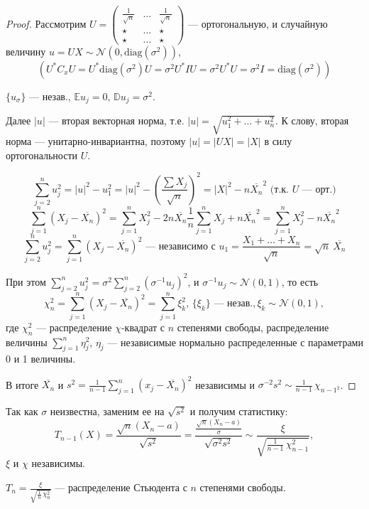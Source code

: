 \begin{enumerate}
\begin{proof}
		Рассмотрим $U = \left(\begin{matrix} \frac1{\sqrt{n}} & \dots & \frac1{\sqrt{n}} \\[-0 pt] \star & \dots & \star \\[-0 pt] \star & \dots & \star \end{matrix}\right)$ --- ортогональную, и случайную величину $u = UX \sim \mathcal{N}(0, \text{diag}(\sigma^2))$, 
		\[ \left( U^{*} C_x U = U^{*}\text{diag}(\sigma^2)U = \sigma^2 U^{*} I U = \sigma^2 U^{*} U = \sigma^2 I = \text{diag}(\sigma^2) \right) \]
		
		$\{ u_{\sigma} \}$ --- незав., $\mathbb{E} u_j = 0, \, \mathbb{D} u_j = \sigma^2$.
		
		Далее $|u|$ --- вторая векторная норма, т.е. $|u| = \sqrt{u_1^2 + \ldots + u_n^2}$. К слову, вторая норма --- унитарно-инвариантна, поэтому $|u| = |UX| = |X|$ в силу ортогональности $U$.
		
		\[ \sum_{j=2}^n u_j^2 = |u|^2 - u_1^2 = |u|^2 - \left( \frac{\sum X_j}{\sqrt{n}} \right)^2 = |X|^2 - n\overline{X_n}^2 \text{ (т.к. $U$ --- орт.)} \]
		\[ \sum_{j=1}^n (X_j - \overline{X_n})^2 = \sum_{j=1}^n X_j^2 - 2n \overline{X_n} \frac{1}{n} \sum_{j=1}^n X_j + n\overline{X_n}^2 = \sum_{j=1}^n X_j^2 - n\overline{X_n}^2 \]
		\[ \sum_{j=2}^n u_j^2 = \sum_{j=1}^n (X_j - \overline{X_n})^2 \text{ --- независимо с } u_1 = \frac{X_1 + \ldots + X_n}{\sqrt{n}} = \sqrt{n}\ \overline{X_n} \]
		
		При этом $\sum_{j=2}^n u_j^2 = \sigma^2 \sum_{j=2}^n (\sigma^{-1} u_j)^2$, и $\sigma^{-1} u_j \sim \mathcal{N}(0, 1)$, то есть
		\[ \chi_n^2 = \sum_{j=1}^n (X_j - \overline{X_n})^2 = \sum_{j=1}^n \xi_k^2, \, \{ \xi_k \} \text{ --- незав.}, \xi_k \sim \mathcal{N}(0, 1), \]
		где $\chi_n^2$ --- распределение $\chi$-квадрат с $n$ степенями свободы, распределение величины $\sum_{j=1}^n \eta_j^2$, $\eta_j$ --- независимые нормально распределенные с параметрами 0 и 1 величины.
		
		В итоге $\overline{X_n}$ и $s^2 = \frac1{n-1} \sum_{j=1}^n (x_j - \overline{X_n})^2$ независимы и $\sigma^{-2}s^2 \sim \frac1{n-1}\,\chi_{n-1^2}$.
	\end{proof}
	
	Так как $\sigma$ неизвестна, заменим ее на $\sqrt{s^2}$ и получим статистику:
	\[ T_{n-1}(X) = \frac{\sqrt{n}(X_n - a)}{\sqrt{s^2}} = \frac{\frac{\sqrt{n}(X_n - a)}{\sigma}}{\sqrt{\sigma^2 s^2}} \sim \frac{\xi}{\sqrt{\frac1{n-1}\,\chi^2_{n-1}}}, \]
	$\xi$ и $\chi$ независимы.
	
	$T_{n} = \frac{\xi}{\sqrt{\frac1n\,\chi_n^2}}$ --- распределение Стьюдента с $n$ степенями свободы.
	

\end{enumerate}
